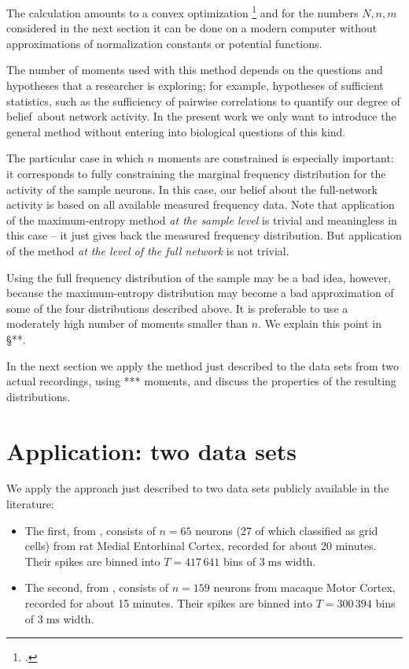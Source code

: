 \documentclass[\ifafour a4paper,12pt,\else a5paper,10pt,\fi%
onecolumn,oneside,article,%
british%
]{memoir}
\theoremstyle{remark}
\theoremstyle{innote}
\newcommand*{\citep}{\footcites}
\renewcommand*{\|}[1][]{\nonscript\,#1\vert\nonscript\;\mathopen{}}
\newcommand*{\sect}{\S}%
\newcommand*{\chap}{ch.}%
\newcommand*{\dob}{degree of belief}
\begin{document}
The calculation amounts to a convex optimization
\citep{meadetal1984}[\chap~10]{pressetal1988_r2007}{fangetal1997,boydetal2004_r2009,portamana2017b}
and for the numbers $N,n,m$ considered in the next section it can be done
on a modern computer without approximations of normalization constants or
potential functions.

\bigskip

The number of moments used with this method depends on the questions and
hypotheses that a researcher is exploring; for example, hypotheses of
sufficient statistics, such as the sufficiency of pairwise correlations to
quantify our \dob\ about network activity. In the present work we
only want to introduce the general method without entering into biological
questions of this kind.

The particular case in which $n$ moments are constrained is especially
important: it corresponds to fully constraining the marginal frequency
distribution for the activity of the sample neurons. In this case, our
belief about the full-network activity is based on all available
measured frequency data. Note that application of the maximum-entropy
method \emph{at the sample level} is trivial and meaningless in this case
-- it just gives back the measured frequency distribution. But application
of the method \emph{at the level of the full network} is not trivial.

Using the full frequency distribution of the sample may be a bad idea,
however, because the maximum-entropy distribution may become a bad
approximation of some of the four distributions described above. It is
preferable to use a moderately high number of moments smaller than $n$. We
explain this point in \sect***.

\bigskip

In the next section we apply the method just described to the data sets
from two actual recordings, using *** moments, and discuss the properties
of the resulting distributions.

\section{Application: two data sets}
\label{sec:application}

We apply the approach just described to two data sets publicly available in
the literature:
\begin{itemize}[wide]
\item The first, from \textcite[rat 14147]{stensolaetal2012},
  consists of $n=65$ neurons (27 of which classified as grid cells) from
  rat Medial Entorhinal Cortex, recorded for about 20 minutes. Their spikes
  are binned into $T=417\,641$ bins of $3\;\textrm{ms}$ width.
\item The second, from
  \textcite{rostamietal2016_r2017}, %
  consists of $n=159$ neurons from macaque Motor Cortex, recorded for about
  15 minutes. Their spikes are binned into $T=300\,394$ bins of
  $3\;\textrm{ms}$ width.
\end{itemize}
\end{document}
